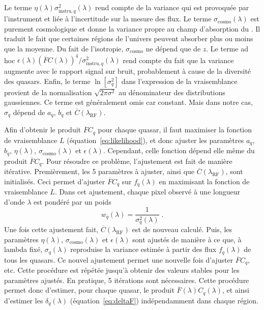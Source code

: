 Le terme $\eta(\lambda)\sigma_{\mathrm{instru}, q}^2(\lambda)$ rend compte de la variance qui est provoquée par l'instrument et liée à l'incertitude sur la mesure des flux. Le terme $\sigma_{\mathrm{cosmo}}(\lambda)$ est purement cosmologique et donne la variance propre au champ d'absorption du \lya{}. Il traduit le fait que certaines régions de l'univers peuvent absorber plus ou moins que la moyenne. Du fait de l'isotropie, $\sigma_{\mathrm{cosmo}}$ ne dépend que de $z$. Le terme ad hoc $\epsilon(\lambda)(\overline F C(\lambda))^4 / \sigma_{\mathrm{instru},q}^2 (\lambda)$ rend compte du fait que la variance augmente avec le rapport signal sur bruit, probablement à cause de la diversité des quasars.
Enfin, le terme $\ln [\sigma_q^2]$ dans l'expression de la vraisemblance provient de la normalisation $\sqrt{2 \pi \sigma^2}$ au dénominateur des distributions gaussiennes. Ce terme est généralement omis car constant. Mais dans notre cas, $\sigma_q$ dépend de $a_q$, $b_q$ et $\overline C(\lambda_{\mathrm{RF}})$.

Afin d'obtenir le produit $\overline F C_q$ pour chaque quasar, il faut maximiser la fonction de vraisemblance $L$ (équation~\ref{eq:likelihood}), et donc ajuster les paramètres $a_q$, $b_q$, $\eta(\lambda)$, $\sigma_{\mathrm{cosmo}}(\lambda)$ et $\epsilon(\lambda)$. Cependant, celle fonction dépend elle même du produit $\overline F C_q$. Pour résoudre ce problème, l'ajustement est fait de manière itérative.
Premièrement, les 5 paramètres à ajuster, ainsi que $\overline C(\lambda_{\mathrm{RF}})$, sont initialisés. Ceci permet d'ajuster $\overline F C_q$ sur $f_q(\lambda)$ en maximisant la fonction de vraisemblance $L$. Dans cet ajustement, chaque pixel observé à une longueur d'onde $\lambda$ est pondéré par un poids
\begin{equation}
  \label{eq:weights}
  w_{q}(\lambda) = \frac{1}{\sigma_{q}^2(\lambda)}  \; .
\end{equation}
Une fois cette ajustement fait, $\overline C(\lambda_{\mathrm{RF}})$ est de nouveau calculé. Puis, les paramètres $\eta(\lambda)$, $\sigma_{\mathrm{cosmo}}(\lambda)$ et $\epsilon(\lambda)$ sont ajustés de manière à ce que, à lambda fixé, $\sigma_q(\lambda)$ reproduise la variance estimée à partir des flux $f_q(\lambda)$ de tous les quasars. Ce nouvel ajustement permet une nouvelle fois d'ajuster $\overline F C_q$, etc. Cette procédure est répétée jusqu'à obtenir des valeurs stables pour les paramètres ajustés. En pratique, 5 itérations sont nécessaires.
Cette procédure permet donc d'estimer, pour chaque quasar, le produit $\overline F(\lambda) C_q(\lambda)$, et ainsi d'estimer les $\delta_q(\lambda)$ (équation~\ref{eq:deltaF}) indépendamment dans chaque région.


